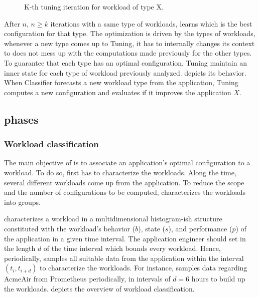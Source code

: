 \begin{figure*}[htp]
    \centering
    \def\svgwidth{\textwidth}
    \scalebox{1.0}{}
    \caption{K-th tuning iteration for workload of type X.}
    \label{fig:tuning-overview}
\end{figure*}

After $n,\, n \geq k$ iterations with a same type of workloads, \name learns
which is the best configuration for that type. The optimization is driven by the
types of workloads, whenever a new type comes up to Tuning, it has to internally
changes its context to does not mess up with the computations made previously
for the other types.  To guarantee that each type has an optimal configuration,
Tuning maintain an inner state for each type of workload previously analyzed.
 depicts its behavior. When Classifier forecasts a new
workload type from the application, Tuning computes a new configuration and
evaluates if it improves the application $X$.

\subsection{\name phases}


\subsubsection{Workload classification}

The main objective of \name is to associate an application's optimal
configuration to a workload. To do so, first \name has to characterize the
workloads. Along the time, several different workloads come up from the
application. To reduce the scope and the number of configurations to be
computed, \name characterizes the workloads into groups.

\name characterizes a workload in a multidimensional histogram-ish structure
constituted with the workload's behavior ($b$), state ($s$), and performance
($p$) of the application in a given time interval. The application engineer
should set in \name the length $d$ of the time interval which bounds every
workload. Hence, periodically, \name samples all suitable data from the
application within the interval $(t_i, t_{i+d})$ to characterize the workloads.
For instance, \name samples data regarding AcmeAir from Prometheus periodically,
in intervals of $d = 6$ hours to build up the workloads.
 depicts the overview of workload
classification.

